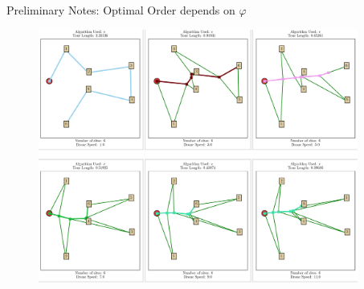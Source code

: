 \documentclass{beamer}
\begin{document}

\begin{frame}[fragile]{Preliminary Notes: Optimal Order depends on $\varphi$}
  \begin{figure}
    \centering
    \includegraphics[width=10.5cm]{slide_imgs/exact_different_drone_speeds.png}
  \end{figure}

  
\end{frame}

\end{document}
